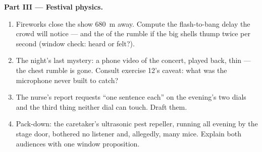 \begin{problem}
\medskip\noindent\textbf{Part III --- Festival physics.}
\begin{enumerate}[resume]
  \item Fireworks close the show \qty{680}{m} away. Compute
        the flash-to-bang delay the crowd will notice ---
        and the  of the rumble if the big shells
        thump twice per second (window check: heard or
        felt?).
  \item The night's last mystery: a phone video of the
        concert, played back,  thin --- the chest
        rumble is gone. Consult exercise 12's caveat: what
        was the microphone never built to catch?
  \item The nurse's report requests ``one sentence each''
        on the evening's two dials and the third thing
        neither dial can touch. Draft them.
  \item Pack-down: the caretaker's ultrasonic pest
        repeller, running all evening by the stage door,
        bothered no listener and, allegedly, many mice.
        Explain both audiences with one window
        proposition.
\end{enumerate}
\end{problem}
